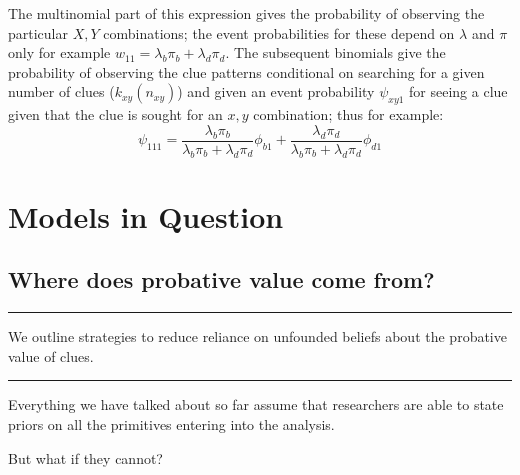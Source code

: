 \documentclass[12pt,]{book}
\begin{document}
The multinomial part of this expression gives the probability of observing the particular \(X,Y\) combinations; the event probabilities for these depend on \(\lambda\) and \(\pi\) only \textbar{} for example \(w_{11} = \lambda_b \pi_b+\lambda_d \pi_d\). The subsequent binomials give the probability of observing the clue patterns conditional on searching for a given number of clues (\(k_{xy}(n_{xy})\)) and given an event probability \(\psi_{xy1}\) for seeing a clue given that the clue is sought for an \(x,y\) combination; thus for example:
\[ \psi_{111} = \frac{\lambda_b \pi_b}{\lambda_b \pi_b+\lambda_d \pi_d} \phi_{b1} + \frac{\lambda_d \pi_d}{\lambda_b \pi_b+\lambda_d \pi_d} \phi_{d1}\]

\hypertarget{part-models-in-question}{%
\part{Models in Question}\label{part-models-in-question}}

\hypertarget{where-does-probative-value-come-from}{%
\chapter{Where does probative value come from?}\label{where-does-probative-value-come-from}}

\begin{center}\rule{0.5\linewidth}{\linethickness}\end{center}

We outline strategies to reduce reliance on unfounded beliefs about the probative value of clues.

\begin{center}\rule{0.5\linewidth}{\linethickness}\end{center}

Everything we have talked about so far assume that researchers are able to state priors on all the primitives entering into the analysis.

But what if they cannot?
\end{document}
